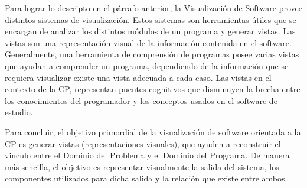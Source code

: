 Para lograr lo descripto en el párrafo anterior, la Visualización de Software provee distintos sistemas de visualización. Estos sistemas son herramientas útiles que se encargan de analizar los distintos módulos de un programa y generar vistas. Las vistas son una representación visual de la información contenida en el software. Generalmente, una herramienta de comprensión de programas posee varias vistas que ayudan a comprender un programa, dependiendo de la información que se requiera visualizar existe una vista adecuada a cada caso. Las vistas en el contexto de la CP, representan puentes cognitivos que disminuyen la brecha entre los conocimientos del programador y los conceptos usados en el software de estudio.

Para concluir, el objetivo primordial de la visualización de software orientada a la CP es generar vistas (representaciones visuales), que ayuden a reconstruir el vinculo entre el Dominio del Problema y el Dominio del Programa. De manera más sencilla, el objetivo es representar visualmente la salida del sistema, los componentes utilizados para dicha salida y la relación que existe entre ambos.







 

